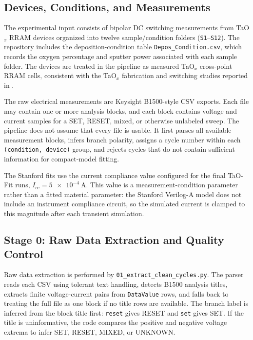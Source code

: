 \documentclass[journal]{IEEEtran}
\begin{document}
\subsection{Devices, Conditions, and Measurements}
\label{sec:devices}

The experimental input consists of bipolar DC switching measurements from
TaO$_x$ RRAM devices organized into twelve sample/condition folders
(\texttt{S1}--\texttt{S12}).  The repository includes the deposition-condition
table \texttt{Depos\_Condition.csv}, which records the oxygen percentage and
sputter power associated with each sample folder.  The devices are treated in
the pipeline as measured TaO$_x$ cross-point RRAM cells, consistent with the
TaO$_x$ fabrication and switching studies reported in
\cite{chowdhury2025mwscas,moazzeni2023}.

The raw electrical measurements are Keysight B1500-style CSV exports.  Each
file may contain one or more analysis blocks, and each block contains voltage
and current samples for a SET, RESET, mixed, or otherwise unlabeled sweep.  The
pipeline does not assume that every file is usable.  It first parses all
available measurement blocks, infers branch polarity, assigns a cycle number
within each \texttt{(condition, device)} group, and rejects cycles that do not
contain sufficient information for compact-model fitting.

The Stanford fits use the current compliance value configured for the final
TaO-Fit runs, $I_{\mathrm{cc}}=\SI{5e-4}{\ampere}$.  This value is a
measurement-condition parameter rather than a fitted material parameter: the
Stanford Verilog-A model does not include an instrument compliance circuit, so
the simulated current is clamped to this magnitude after each transient
simulation.

\subsection{Stage 0: Raw Data Extraction and Quality Control}
\label{sec:stage0}

Raw data extraction is performed by \texttt{01\_extract\_clean\_cycles.py}.
The parser reads each CSV using tolerant text handling, detects B1500 analysis
titles, extracts finite voltage-current pairs from \texttt{DataValue} rows,
and falls back to treating the full file as one block if no title rows are
available.  The branch label is inferred from the block title first:
\texttt{reset} gives RESET and \texttt{set} gives SET.  If the title is
uninformative, the code compares the positive and negative voltage extrema to
infer SET, RESET, MIXED, or UNKNOWN.
\end{document}
